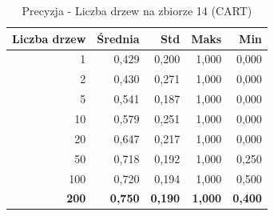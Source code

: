 \begin{table}[htbp]
\centering
\small
\setlength{\tabcolsep}{6pt}
\renewcommand{\arraystretch}{1.2}
\caption{Precyzja - Liczba drzew na zbiorze 14 (CART)}
\label{tab:CART_tree_count_14_precision}
\begin{tabular}{r|r|r|r|r}
\toprule
Liczba drzew & Średnia & Std & Maks & Min \\
\hline
1 & 0,429 & 0,200 & 1,000 & 0,000 \\
2 & 0,430 & 0,271 & 1,000 & 0,000 \\
5 & 0,541 & 0,187 & 1,000 & 0,000 \\
10 & 0,579 & 0,251 & 1,000 & 0,000 \\
20 & 0,647 & 0,217 & 1,000 & 0,000 \\
50 & 0,718 & 0,192 & 1,000 & 0,250 \\
100 & 0,720 & 0,194 & 1,000 & 0,500 \\
\textbf{200} & \textbf{0,750} & \textbf{0,190} & \textbf{1,000} & \textbf{0,400} \\
\bottomrule
\end{tabular}
\end{table}